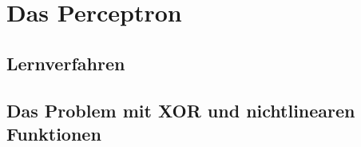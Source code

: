 \section{Das Perceptron}

\subsection{Lernverfahren}

\subsection{Das Problem mit XOR und nichtlinearen Funktionen}